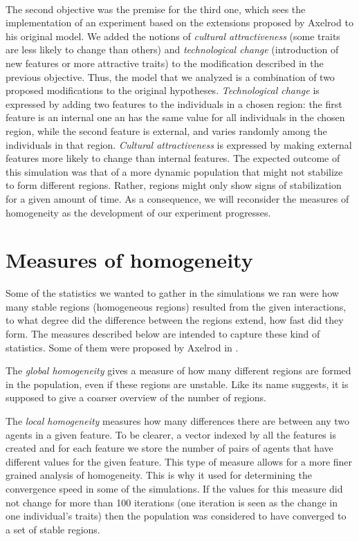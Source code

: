 \documentclass[twoside, 11pt, a4paper]{article}
\begin{document}
\paragraph*{}The second objective was the premise for the third one, which sees the implementation of an experiment based on the extensions proposed by Axelrod to his original model. We added the notions of \emph{cultural attractiveness} (some traits are less likely to change than others) and \emph{technological change} (introduction of new features or more attractive traits) to the modification described in the previous objective. Thus, the model that we analyzed is a combination of two proposed modifications to the original hypotheses. 
\emph{Technological change} is expressed by adding two features to the individuals in a chosen region: the first feature is an internal one an has the same value for all individuals in the chosen region, while the second feature is external, and varies randomly among the individuals in that region.
\emph{Cultural attractiveness} is expressed by making external features more likely to change than internal features. 
The expected outcome of this simulation was that of a more dynamic population that might not stabilize to form different regions. Rather, regions might only show signs of stabilization for a given amount of time. As a consequence, we will reconsider the measures of homogeneity as the development of our experiment progresses.

 \section{Measures of homogeneity}

Some of the statistics we wanted to gather in the simulations we ran were how many stable regions (homogeneous regions) resulted from the given interactions, to what degree did the difference between the regions extend, how fast did they form.
The measures described below are intended to capture these kind of statistics. Some of them were proposed by Axelrod in \cite{Axelrod}.

The \emph{global homogeneity} gives a measure of how many different regions are formed in the population, even if these regions are unstable. Like its name suggests, it is supposed to give a coarser overview of the number of regions.

The \emph{local homogeneity} measures how many differences there are between any two agents in a given feature.
To be clearer, a vector indexed by all the features is created and for each feature we store the number of pairs of agents that have different values for the given feature.
This type of measure allows for a more finer grained analysis of homogeneity. This is why it used for determining the convergence speed in some of the simulations. If the values for this measure did not change for more than 100 iterations (one iteration is seen as the change in one individual's traits) then the population was considered to have converged to a set of stable regions.
\end{document}
